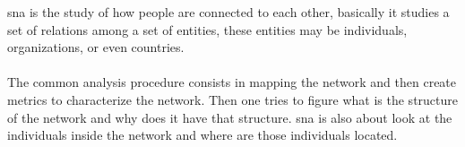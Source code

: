 %
%

\gls{sna} is the study of how people are connected to each other, basically it studies a set of relations among a set of entities,
these entities may be individuals, organizations, or even countries.\\\\
\indent The common analysis procedure consists in mapping the network and then create metrics to
characterize the network. Then one tries to figure what is the structure of the network and why does
it have that structure. \gls{sna} is also about look at the individuals inside the network and where are those individuals located.

